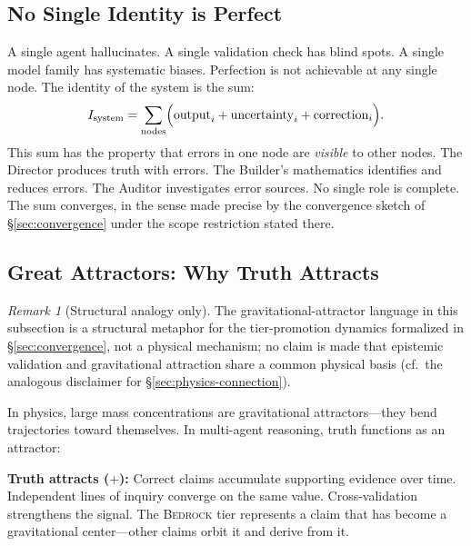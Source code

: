 \documentclass[11pt]{article}
\theoremstyle{definition}
\theoremstyle{remark}
\newtheorem{remark}[theorem]{Remark}
\newcommand{\BEDROCK}{\textsc{Bedrock}}
\begin{document}
\subsection{No Single Identity is Perfect}
\label{sec:no-single-identity}

A single agent hallucinates.  A single validation check has blind spots.  A
single model family has systematic biases.  Perfection is not achievable at any
single node.  The identity of the system is the sum:
\begin{equation}
  I_{\mathrm{system}}
  = \sum_{\text{nodes}} \Bigl(
      \mathrm{output}_i + \mathrm{uncertainty}_i + \mathrm{correction}_i
    \Bigr).
  \label{eq:system-identity}
\end{equation}
This sum has the property that errors in one node are \emph{visible} to other
nodes.  The Director produces truth with errors.  The Builder's mathematics
identifies and reduces errors.  The Auditor investigates error sources.  No
single role is complete.  The sum converges, in the sense made precise by the
convergence sketch of \S\ref{sec:convergence} under the scope restriction
stated there.

\subsection{Great Attractors: Why Truth Attracts}
\label{sec:attractors}

\begin{remark}[Structural analogy only]
The gravitational-attractor language in this subsection is a structural
metaphor for the tier-promotion dynamics formalized in \S\ref{sec:convergence},
not a physical mechanism; no claim is made that epistemic validation and
gravitational attraction share a common physical basis (cf.\ the analogous
disclaimer for \S\ref{sec:physics-connection}).
\end{remark}

In physics, large mass concentrations are gravitational attractors---they bend
trajectories toward themselves.  In multi-agent reasoning, truth functions as an
attractor:

\medskip
\noindent\textbf{Truth attracts ($+$):}  Correct claims accumulate supporting
evidence over time.  Independent lines of inquiry converge on the same value.
Cross-validation strengthens the signal.  The \BEDROCK{} tier represents a claim
that has become a gravitational center---other claims orbit it and derive from it.
\end{document}
